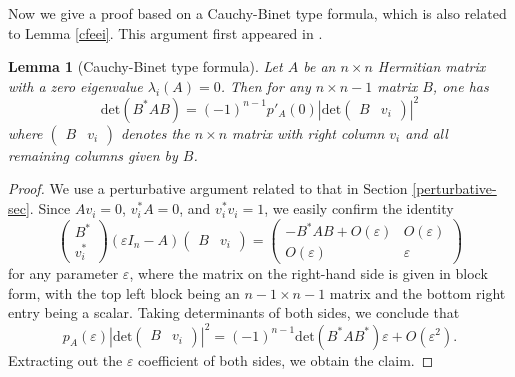 \documentclass[12pt]{amsart}
\newcommand\eps{\varepsilon}
\newtheorem{lemma}{Lemma}
\begin{document}
Now we give a proof based on a Cauchy-Binet type formula, which is also related to Lemma \ref{cfeei}.  This argument first appeared in \cite{DPTZ}.

\begin{lemma}[Cauchy-Binet type formula]\label{cbtf}  Let $A$ be an $n \times n$ Hermitian matrix with a zero eigenvalue $\lambda_i(A) = 0$.  Then for any $n \times n-1$ matrix $B$, one has
$$ \mathrm{det}( B^* A B ) = (-1)^{n-1} p'_A(0) \left| \mathrm{det} \begin{pmatrix} B & v_i \end{pmatrix} \right|^2 $$
where $\begin{pmatrix} B & v_i \end{pmatrix}$ denotes the $n \times n$ matrix with right column $v_i$ and all remaining columns given by $B$.
\end{lemma}

\begin{proof} We use a perturbative argument related to that in Section \ref{perturbative-sec}.  Since $A v_i = 0$, $v_i^* A = 0$, and $v_i^* v_i = 1$, we easily confirm the identity
$$ \begin{pmatrix} B^* \\ v_i^* \end{pmatrix} (\eps I_n-A) \begin{pmatrix} B & v_i \end{pmatrix} = \begin{pmatrix} -B^* A B +O(\eps)& O(\eps) \\ O(\eps) & \eps \end{pmatrix}$$
for any parameter $\eps$, where the matrix on the right-hand side is given in block form, with the top left block being an $n-1 \times n-1$ matrix and the bottom right entry being a scalar.  Taking determinants of both sides, we conclude that
$$ p_A(\eps) \left| \mathrm{det} \begin{pmatrix} B & v_i \end{pmatrix} \right|^2 = (-1)^{n-1} \mathrm{det}( B^* A B^* ) \eps + O(\eps^2).$$
Extracting out the $\eps$ coefficient of both sides, we obtain the claim.
\end{proof}
\end{document}
